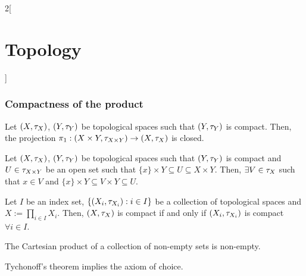 \documentclass[../../../main.tex]{subfiles}
\begin{document}
\begin{multicols}{2}[\section{Topology}]
  \subsubsection{Compactness of the product}
  \begin{prop}
    Let $(X,\tau_X)$, $(Y,\tau_Y)$ be topological spaces such that $(Y,\tau_Y)$ is compact. Then, the projection $\pi_1:(X\times Y,\tau_{X\times Y})\rightarrow (X,\tau_X)$ is closed.
  \end{prop}
  \begin{lemma}
    Let $(X,\tau_X)$, $(Y,\tau_Y)$ be topological spaces such that $(Y,\tau_Y)$ is compact and $U\in\tau_{X\times Y}$ be an open set such that $\{x\}\times Y\subseteq U\subseteq X\times Y$. Then, $\exists V\in\tau_X$ such that $x\in V$ and $\{x\}\times Y\subseteq V\times Y\subseteq U$.
  \end{lemma}
  \begin{theorem}
    Let $I$ be an index set, $\{(X_i,\tau_{X_i}):i\in I\}$ be a collection of topological spaces and $X:=\prod_{i\in I}X_i$. Then, $(X,\tau_X)$ is compact if and only if $(X_i,\tau_{X_i})$ is compact $\forall i\in I$.
  \end{theorem}
  \begin{axiom}
    The Cartesian product of a collection of non-empty sets is non-empty.
  \end{axiom}
  \begin{theorem}
    Tychonoff's theorem implies the axiom of choice.
  \end{theorem}

\end{multicols}
\end{document}
